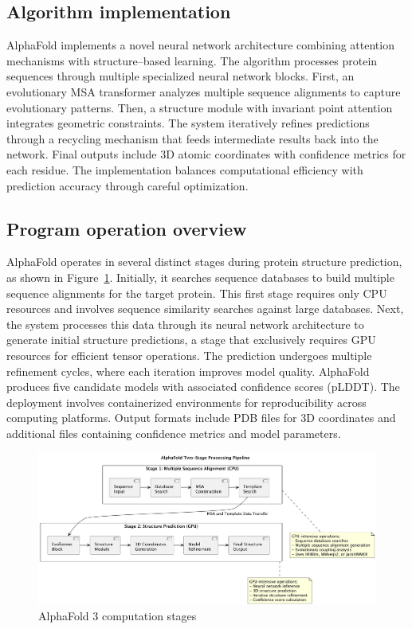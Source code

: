 \subsection{Algorithm implementation}

AlphaFold implements a novel neural network architecture combining attention mechanisms with structure--based learning.
The algorithm processes protein sequences through multiple specialized neural network blocks.
First, an evolutionary MSA transformer analyzes multiple sequence alignments to capture evolutionary patterns.
Then, a structure module with invariant point attention integrates geometric constraints.
The system iteratively refines predictions through a recycling mechanism that feeds intermediate results back into the network.
Final outputs include 3D atomic coordinates with confidence metrics for each residue.
The implementation balances computational efficiency with prediction accuracy through careful optimization.

\subsection{Program operation overview}

AlphaFold operates in several distinct stages during protein structure prediction, as shown in Figure~\ref{fig:alphafold}.
Initially, it searches sequence databases to build multiple sequence alignments for the target protein.
This first stage requires only CPU resources and involves sequence similarity searches against large databases.
Next, the system processes this data through its neural network architecture to generate initial structure predictions, a stage that exclusively requires GPU resources for efficient tensor operations.
The prediction undergoes multiple refinement cycles, where each iteration improves model quality.
AlphaFold produces five candidate models with associated confidence scores (pLDDT). The deployment involves containerized environments for reproducibility across computing platforms.
Output formats include PDB files for 3D coordinates and additional files containing confidence metrics and model parameters.

\begin{figure}[htbp]
    \centering
    \includegraphics[width=\textwidth]{images/alphafold}
    \caption{AlphaFold 3 computation stages}
    \label{fig:alphafold}
\end{figure}

